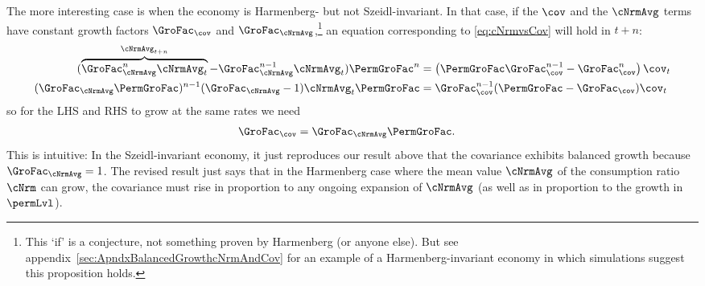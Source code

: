\documentclass[BufferStockTheory]{subfiles}
\begin{document}
The more interesting case is when the economy is Harmenberg- but not Szeidl-invariant.
In that case, if the $\cov$ and the $\cNrmAvg$ terms have constant growth factors $\GroFac_{\cov}$ and $\GroFac_{\cNrmAvg}$,\footnote{This `if' is a conjecture, not something proven by Harmenberg (or anyone else).
But see appendix~\ref{sec:ApndxBalancedGrowthcNrmAndCov} for an example of a Harmenberg-invariant economy in which simulations suggest this proposition holds.} an equation corresponding to \eqref{eq:cNrmvsCov} will hold in $t+n$:
\begin{equation} \label{eq:aNrmGrovsCovGronm1}
  \begin{split}
    (\overbrace{\GroFac_{\cNrmAvg}^{n}\cNrmAvg_{t}}^{\cNrmAvg_{t+n}}-\GroFac^{n-1}_{\cNrmAvg}\cNrmAvg_{t})\PermGroFac^{n} & = \left(\PermGroFac\GroFac_{\cov}^{n-1} -\GroFac_{\cov}^{n}\right)\cov_{t}
    \\ (\GroFac_{\cNrmAvg}\PermGroFac)^{n-1} (\GroFac_{\cNrmAvg}-1)\cNrmAvg_{t}\PermGroFac & = \GroFac_{\cov}^{n-1}(\PermGroFac - \GroFac_{\cov}) \cov_{t}
  \end{split}
\end{equation}
so for the LHS and RHS to grow at the same rates we need
\begin{align}
  \GroFac_{\cov}  & = \GroFac_{\cNrmAvg}\PermGroFac \label{eq:aNrmGrovscovGro}.
\end{align}
This is intuitive:  In the Szeidl-invariant economy, it just reproduces our result above that the covariance exhibits balanced growth because $\GroFac_{\cNrmAvg}=1$.
The revised result just says that in the Harmenberg case where the mean value $\cNrmAvg$ of the consumption ratio $\cNrm$ can grow, the covariance must rise in proportion to any ongoing expansion of $\cNrmAvg$ (as well as in proportion to the growth in $\permLvl$).
\end{document}
